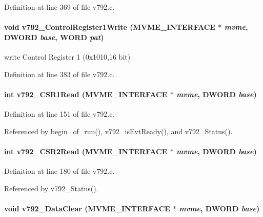 Definition at line 369 of file v792.c.
\paragraph[{v792\_\-ControlRegister1Write}]{\setlength{\rightskip}{0pt plus 5cm}void v792\_\-ControlRegister1Write ({\bf MVME\_\-INTERFACE} $\ast$ {\em mvme}, \/  {\bf DWORD} {\em base}, \/  {\bf WORD} {\em pat})}\hfill\label{v792_8c_ac3b568047c03f5b511378cd608eb11fd}
write Control Register 1 (0x1010,16 bit) 

Definition at line 383 of file v792.c.
\paragraph[{v792\_\-CSR1Read}]{\setlength{\rightskip}{0pt plus 5cm}int v792\_\-CSR1Read ({\bf MVME\_\-INTERFACE} $\ast$ {\em mvme}, \/  {\bf DWORD} {\em base})}\hfill\label{v792_8c_a01124a009c024fb70d7243658facd6b9}


Definition at line 151 of file v792.c.

Referenced by begin\_\-of\_\-run(), v792\_\-isEvtReady(), and v792\_\-Status().
\paragraph[{v792\_\-CSR2Read}]{\setlength{\rightskip}{0pt plus 5cm}int v792\_\-CSR2Read ({\bf MVME\_\-INTERFACE} $\ast$ {\em mvme}, \/  {\bf DWORD} {\em base})}\hfill\label{v792_8c_a9ae4f1b71440bde11d896df999b80e7e}


Definition at line 180 of file v792.c.

Referenced by v792\_\-Status().
\paragraph[{v792\_\-DataClear}]{\setlength{\rightskip}{0pt plus 5cm}void v792\_\-DataClear ({\bf MVME\_\-INTERFACE} $\ast$ {\em mvme}, \/  {\bf DWORD} {\em base})}\hfill\label{v792_8c_a526dbfe955e68a6e982bb5a3345b74e3}


